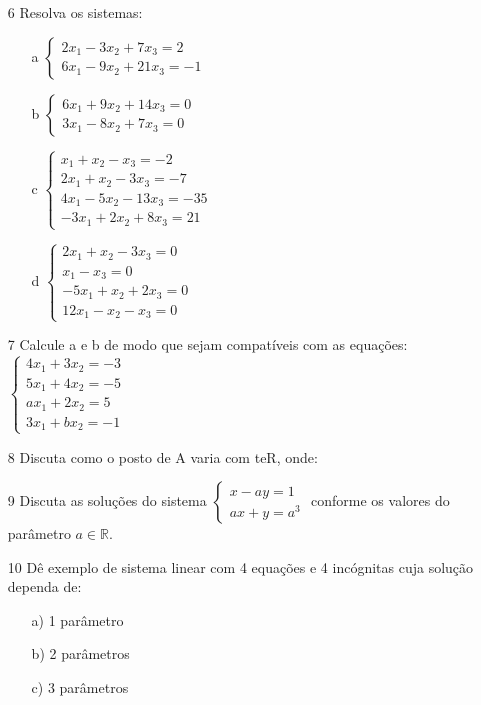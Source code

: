 \documentclass[11pt]{article}
\begin{document}
\begin{itemize}
\item[6] Resolva os sistemas:
\begin{itemize}
\item[a]
$ \left\{
\begin{array}{ll}
\displaystyle 2x_1 - 3x_2 + 7x_3 = 2 \\
\displaystyle 6x_1 - 9x_2 + 21x_3 = -1
\end{array}
\right.
$
\item[b]
$ \left\{
\begin{array}{ll}
\displaystyle 6x_1+9x_2+14x_3=0 \\
\displaystyle 3x_1-8x_2+7x_3=0
\end{array}
\right.
$
\item[c]
$ \left\{
\begin{array}{llll}
\displaystyle x_1+x_2-x_3=-2 \\
\displaystyle 2x_1+x_2-3x_3=-7 \\
\displaystyle 4x_1-5x_2-13x_3=-35 \\
\displaystyle -3x_1+2x_2+8x_3=21
\end{array}
\right.
$
\item[d]
$ \left\{
\begin{array}{llll}
\displaystyle 2x_1+x_2-3x_3=0 \\
\displaystyle x_1-x_3=0 \\
\displaystyle -5x_1+x_2+2x_3=0 \\
\displaystyle 12x_1-x_2-x_3=0
\end{array}
\right.
$
\end{itemize}

\item[7] Calcule a e b de modo que sejam compatíveis com as equações:\\
$ \left\{
\begin{array}{llll}
\displaystyle 4x_1+3x_2=-3 \\
\displaystyle 5x_1+4x_2=-5 \\
\displaystyle ax_1+2x_2=5 \\
\displaystyle 3x_1+bx_2=-1
\end{array}
\right.
$

\item[8] Discuta como o posto de A varia com teR, onde:

\item[9] Discuta as soluções do sistema
$ \left\{
\begin{array}{ll}
\displaystyle x - ay = 1 \\
\displaystyle ax + y = a^3
\end{array}
\right.
$ conforme os valores do parâmetro $a \in \mathbb{R}.$

\item[10] Dê exemplo de sistema linear com 4 equações e 4 incógnitas cuja solução dependa de:
\begin{enumerate}
\item[a)] 1 parâmetro
\item[b)] 2 parâmetros
\item[c)] 3 parâmetros
\end{enumerate}

\end{itemize}
								
\end{document}
